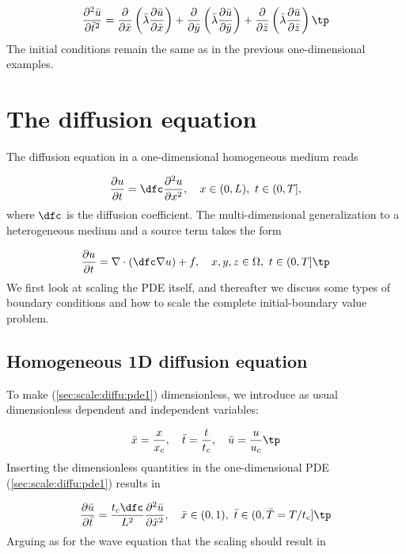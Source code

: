 \documentclass[graybox,envcountchap,sectrefs,final]{svmonodo}
\begin{document}
\begin{equation}
\frac{\partial^2 \bar u}{\partial \bar t^2} =
\frac{\partial}{\partial \bar x}\left(\bar\lambda\frac{\partial \bar u}{\partial \bar x}\right)+
\frac{\partial}{\partial \bar y}\left(\bar\lambda\frac{\partial \bar u}{\partial \bar y}\right)+
\frac{\partial}{\partial \bar z}\left(\bar\lambda\frac{\partial \bar u}{\partial \bar z}\right)\tp
\end{equation}
The initial conditions remain the same as in the previous one-dimensional
examples.

\section{The diffusion equation}
\label{sec:scale:diffu}

The diffusion equation in a one-dimensional homogeneous medium reads

\begin{equation}
\frac{\partial u}{\partial t} =
\dfc\frac{\partial^2 u}{\partial x^2}, \quad  x\in (0,L),\ t\in (0,T],
\label{sec:scale:diffu:pde1}
\end{equation}
where $\dfc$ is the diffusion coefficient. The
multi-dimensional generalization to a heterogeneous medium
and a source term takes the form

\begin{equation}
\frac{\partial u}{\partial t} =
\nabla\cdot\left(\dfc \nabla u\right) + f, \quad  x,y,z\in \Omega,\ t\in (0,T]\tp
\label{sec:scale:diffu:pde1:3D}
\end{equation}
We first look at scaling the PDE itself, and thereafter we discuss
some types of boundary conditions and how to scale the complete
initial-boundary value problem.


\subsection{Homogeneous 1D diffusion equation}
\label{sec:scale:diffu:homo1D}

To make (\ref{sec:scale:diffu:pde1}) dimensionless,
we introduce as usual dimensionless dependent and independent variables:

\[ \bar x = \frac{x}{x_c},
\quad \bar t = \frac{t}{t_c}, \quad \bar u =\frac{u}{u_c}\tp\]
Inserting the dimensionless quantities in the one-dimensional
PDE (\ref{sec:scale:diffu:pde1}) results in

\[
\frac{\partial \bar u}{\partial \bar t} =
\frac{t_c\dfc}{L^2}
\frac{\partial^2 \bar u}{\partial \bar x^2}, \quad  \bar x\in (0,1),\ \bar t\in (0,\bar T = T/t_c]\tp
\label{sec:scale:diffu:pde1:d0}
\]
Arguing as for the wave equation that the scaling should result in
\end{document}
